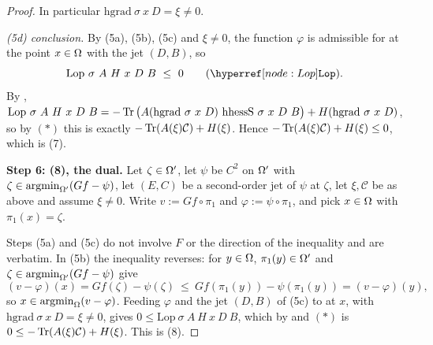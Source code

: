 \begin{proof}
In particular $\mathrm{hgrad}\ \sigma\ x\ D=\xi\ne0$.

\emph{(5d) conclusion.} By (5a), (5b), (5c) and $\xi\ne0$, the function $\varphi$ is
admissible for  at the point $x\in\Omega$ with the jet $(D,B)$, so
\[
 \mathrm{Lop}\ \sigma\ A\ H\ x\ D\ B\ \le\ 0\qquad(\noderef{Lop}).
\]
By ,
$\mathrm{Lop}\ \sigma\ A\ H\ x\ D\ B
=-\Tr\big(A(\mathrm{hgrad}\ \sigma\ x\ D)\ \mathrm{hhessS}\ \sigma\ x\ D\ B\big)
+H(\mathrm{hgrad}\ \sigma\ x\ D)$, so by $(\ast)$ this is exactly
$-\operatorname{Tr}(A(\xi)\mathcal C)+H(\xi)$. Hence $-\operatorname{Tr}(A(\xi)\mathcal C)+H(\xi)\le0$, which is (7).

\medskip\noindent\textbf{Step 6: (8), the dual.} Let $\zeta\in\Omega'$, let $\psi$ be $C^{2}$ on
$\Omega'$ with $\zeta\in\operatorname*{argmin}_{\Omega'}(Gf-\psi)$, let $(E,C)$ be a second-order jet of $\psi$ at
$\zeta$, let $\xi,\mathcal C$ be as above and assume $\xi\ne0$. Write $v:=Gf\circ\pi_1$ and
$\varphi:=\psi\circ\pi_1$, and pick $x\in\Omega$ with $\pi_1(x)=\zeta$.

Steps (5a) and (5c) do not involve $F$ or the direction of the inequality and are verbatim.
In (5b) the inequality reverses: for $y\in\Omega$, $\pi_1(y)\in\Omega'$ and
$\zeta\in\operatorname*{argmin}_{\Omega'}(Gf-\psi)$ give
\[
 (v-\varphi)(x)=Gf(\zeta)-\psi(\zeta)\ \le\ Gf(\pi_1(y))-\psi(\pi_1(y))=(v-\varphi)(y),
\]
so $x\in\operatorname*{argmin}_\Omega(v-\varphi)$. Feeding $\varphi$ and the jet $(D,B)$ of (5c) to
 at $x$, with $\mathrm{hgrad}\ \sigma\ x\ D=\xi\ne0$, gives
$0\le\mathrm{Lop}\ \sigma\ A\ H\ x\ D\ B$, which by  and $(\ast)$ is
$0\le-\operatorname{Tr}(A(\xi)\mathcal C)+H(\xi)$. This is (8).
\end{proof}
